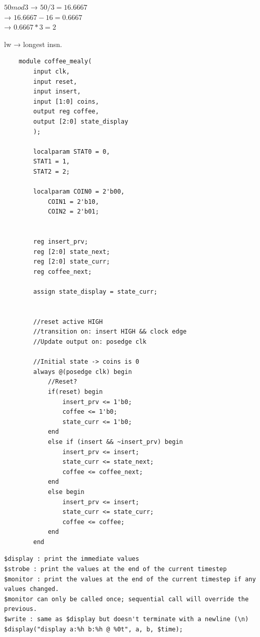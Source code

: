\documentclass[12pt,landscape,a4paper]{article}
\begin{document}
\begin{multicols}{4}
\begin{minipage}[t]{\linewidth}

$50 mod 3$ → $50/3 = 16.6667$ \\
→ $16.6667 - 16 = 0.6667$ \\
→ $0.6667 * 3 = 2$

lw → longest insn.
\end{minipage}

\begin{tiny}
\begin{verbatim}
    module coffee_mealy(
        input clk,
        input reset,
        input insert,
        input [1:0] coins,
        output reg coffee,
        output [2:0] state_display
        );
        
        localparam STAT0 = 0,
        STAT1 = 1,
        STAT2 = 2;
            
        localparam COIN0 = 2'b00,
            COIN1 = 2'b10,
            COIN2 = 2'b01;
            
        
        reg insert_prv;
        reg [2:0] state_next;
        reg [2:0] state_curr;
        reg coffee_next;
        
        assign state_display = state_curr;
    
        
        //reset active HIGH
        //transition on: insert HIGH && clock edge
        //Update output on: posedge clk
        
        //Initial state -> coins is 0
        always @(posedge clk) begin
            //Reset?
            if(reset) begin
                insert_prv <= 1'b0;
                coffee <= 1'b0;
                state_curr <= 1'b0;
            end
            else if (insert && ~insert_prv) begin
                insert_prv <= insert;
                state_curr <= state_next;
                coffee <= coffee_next;
            end
            else begin
                insert_prv <= insert;
                state_curr <= state_curr;
                coffee <= coffee;
            end
        end
    \end{verbatim}
\end{tiny}
\begin{tiny}
\begin{verbatim}
$display : print the immediate values
$strobe : print the values at the end of the current timestep
$monitor : print the values at the end of the current timestep if any values changed. 
$monitor can only be called once; sequential call will override the previous.
$write : same as $display but doesn't terminate with a newline (\n) 
$display("display a:%h b:%h @ %0t", a, b, $time);


\end{verbatim}
\end{tiny}
\end{multicols}
\end{document}
